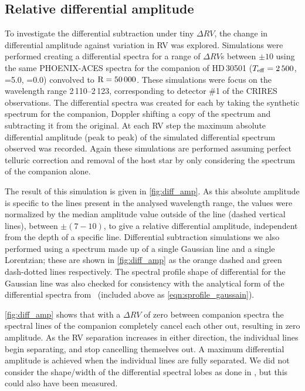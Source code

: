 \subsection{Relative differential amplitude}
To investigate the differential subtraction under tiny \(\Delta RV\), the change in differential amplitude against variation in {RV} was explored.
Simulations were performed creating a differential spectra for a range of \(\Delta {RV}\)s between \(\pm10\)\kmps{} using the same {PHOENIX-ACES} spectra for the companion of {HD\,30501} (\(T_{\mathrm{eff}}{}=2\,500\)\K{}, \logg{}=5.0, \feh{}=0.0) convolved to \(\textrm{R}=50\,000\).
These simulations were focus on the wavelength range 2\,110--2\,123\nm{}, corresponding to detector \#1 of the {CRIRES} observations.
The differential spectra was created for each by taking the synthetic spectrum for the companion, Doppler shifting a copy of the spectrum and subtracting it from the original.
At each {RV} step the maximum absolute differential amplitude (peak to peak) of the simulated differential spectrum observed was recorded.
Again these simulations are performed assuming perfect telluric correction and removal of the host star by only considering the spectrum of the companion alone.

The result of this simulation is given in \cref{fig:diff_amp}.
As this absolute amplitude is specific to the lines present in the analysed wavelength range, the values were normalized by the median amplitude value outside of the line {\fwhm} (dashed vertical lines), between \(\pm(7-10)\)\kmps{}, to give a relative differential amplitude, independent from the depth of a specific line.
Differential subtraction simulations we also performed using a spectrum made up of a single Gaussian line and a single Lorentzian; these are shown in \cref{fig:diff_amp} as the orange dashed and green dash-dotted lines respectively.
The spectral profile shape of differential for the Gaussian line was also checked for consistency with the analytical form of the differential spectra from~\citet[][Equation~A.1]{ferluga_separating_1997} (included above as \cref{eqn:sprofile_gaussain}).

\cref{fig:diff_amp} shows that with a \(\Delta {RV}\) of zero between companion spectra the spectral lines of the companion completely cancel each other out, resulting in zero amplitude.
As the {RV} separation increases in either direction, the individual lines begin separating, and stop cancelling themselves out.
A maximum differential amplitude is achieved when the individual lines are fully separated.
We did not consider the shape/width of the differential spectral lobes as done in \citet[][eqn.~A.1]{ferluga_separating_1997}, but this could also have been measured.

